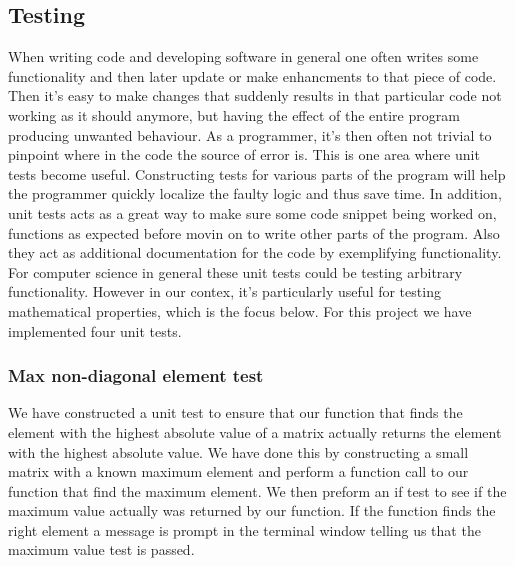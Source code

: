 \documentclass[12pt]{article}
\numberwithin{figure}{section}
\numberwithin{table}{section}
\begin{document}
\pagebreak



\subsection{Testing}
\label{sec:testing}
When writing code and developing software in general one often writes some functionality and then later update or make enhancments to that piece of code. Then it's easy to make changes that suddenly results in that particular code not working as it should anymore, but having the effect of the entire program producing unwanted behaviour. As a programmer, it's then often not trivial to pinpoint where in the code the source of error is. This is one area where unit tests become useful. Constructing tests for various parts of the program will help the programmer quickly localize the faulty logic and thus save time. In addition, unit tests acts as a great way to make sure some code snippet being worked on, functions as expected before movin on to write other parts of the program. Also they act as additional documentation for the code by exemplifying functionality. For computer science in general these unit tests could be testing arbitrary functionality. However in our contex, it's particularly useful for testing mathematical properties, which is the focus below. For this project we have implemented four unit tests.

\subsubsection{Max non-diagonal element test}

\noindent We have constructed a unit test to ensure that our function that finds the element with the highest absolute value of a matrix actually returns the element with the highest absolute value. We have done this by constructing a small matrix with a known maximum element and perform a function call to our function that find the maximum element. We then preform an if test to see if the maximum value actually was returned by our function. If the function finds the right element a message is prompt in the terminal window telling us that the maximum value test is passed.

\end{document}
